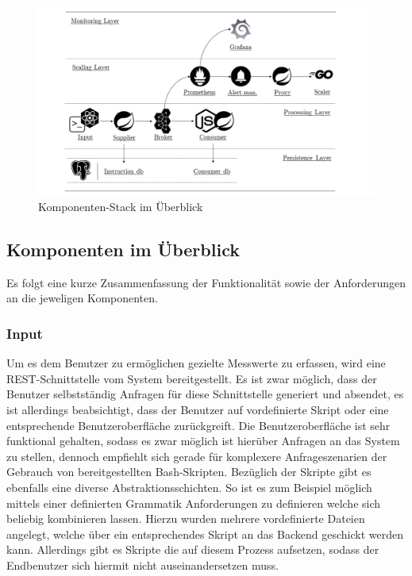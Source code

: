 \begin{figure}[ht!]
	\centering
	\includegraphics[width=\linewidth]{kapitel/problemloesung/implementierung/_img/overview-bw}
	\caption[Komponenten-Stack im Überblick]{Komponenten-Stack im Überblick}
	\label{fig:stackOverview}
\end{figure}



\subsection{Komponenten im Überblick}
Es folgt eine kurze Zusammenfassung der Funktionalität sowie der Anforderungen an die jeweligen Komponenten.

\subsubsection{Input}
Um es dem Benutzer zu ermöglichen gezielte Messwerte zu erfassen, wird eine REST-Schnittstelle vom System bereitgestellt. Es ist zwar möglich, dass der Benutzer selbstständig Anfragen für diese Schnittstelle generiert und absendet, es ist allerdings beabsichtigt, dass der Benutzer auf vordefinierte Skript oder eine entsprechende Benutzeroberfläche zurückgreift. Die Benutzeroberfläche ist sehr funktional gehalten, sodass es zwar möglich ist hierüber Anfragen an das System zu stellen, dennoch empfiehlt sich gerade für komplexere Anfrageszenarien der Gebrauch von bereitgestellten Bash-Skripten. Bezüglich der Skripte gibt es ebenfalls eine diverse Abstraktionsschichten. So ist es zum Beispiel möglich mittels einer definierten Grammatik Anforderungen zu definieren welche sich beliebig kombinieren lassen. Hierzu wurden mehrere vordefinierte Dateien angelegt, welche über ein entsprechendes Skript an das Backend geschickt werden kann. Allerdings gibt es Skripte die auf diesem Prozess aufsetzen, sodass der Endbenutzer sich hiermit nicht auseinandersetzen muss. 


